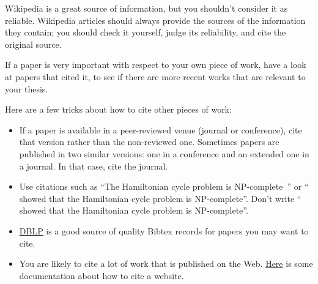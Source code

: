 Wikipedia is a great source of information, but you shouldn't consider it as reliable.
Wikipedia articles should always provide the sources of the information they contain; you
should check it yourself, judge its reliability, and cite the original source.

If a paper is very important with respect to your own piece of work, have a look at papers
that cited it, to see if there are more recent works that are relevant to your thesis.

Here are a few tricks about how to cite other pieces of work:
\begin{itemize}
  \item If a paper is available in a peer-reviewed venue (journal or conference), cite that
  version rather than the non-reviewed one. Sometimes papers are published in two similar
  versions: one in a conference and an extended one in a journal. In that case, cite the
  journal.
  \item Use citations such as ``The Hamiltonian cycle problem is
  NP-complete~\cite{DBLP:conf/coco/Karp72}'' or ``\textcite{DBLP:conf/coco/Karp72} showed
  that the Hamiltonian cycle problem is NP-complete''. Don't write
  ``\cite{DBLP:conf/coco/Karp72} showed that the Hamiltonian cycle problem is NP-complete''.
  \item \href{https://dblp.org}{DBLP} is a good source of quality Bibtex records for papers
  you may want to cite.
  \item You are likely to cite a lot of work that is published on the Web.
  \href{https://bibtex.eu/faq/how-can-i-use-bibtex-to-cite-a-website/}{Here} is some
  documentation about how to cite a website.
\end{itemize}

